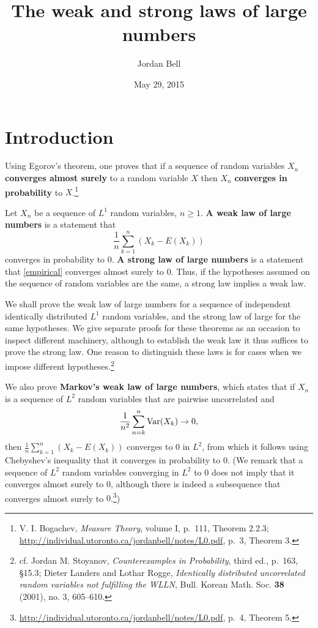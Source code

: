 \documentclass{article}
\newcommand{\Var}{\ensuremath\mathrm{Var}}
\theoremstyle{definition}
\begin{document}
\title{The weak and strong laws of large numbers}
\author{Jordan Bell}
\date{May 29, 2015}

\maketitle

\section{Introduction}
Using Egorov's theorem, one proves that if
a sequence of random variables $X_n$ \textbf{converges almost surely} to a random variable $X$ then
$X_n$ \textbf{converges in probability} to $X$.\footnote{
V. I. Bogachev, {\em Measure Theory}, volume I, p.~111, Theorem 2.2.3;
\url{http://individual.utoronto.ca/jordanbell/notes/L0.pdf},
p.~3, Theorem 3.}

Let $X_n$ be a sequence of $L^1$ random variables, $n \geq 1$. 
\textbf{A weak law of large numbers} is a statement 
that
\begin{equation}
\frac{1}{n} \sum_{k=1}^n(X_k-E(X_k))
\label{empirical}
\end{equation}
 converges in probability to $0$.
\textbf{A strong law of large numbers} is a statement
that
\eqref{empirical}
 converges almost surely to $0$. 
Thus, if the hypotheses assumed on the sequence of random variables
are the same, a strong law implies a weak law.

We shall
prove the weak law of large numbers for a sequence of
 independent identically distributed $L^1$ random variables, and the strong law of large
for the same hypotheses. We give separate proofs for these theorems as an occasion  to inspect different machinery,
although to establish the weak law it thus suffices
to prove the strong law. One reason to distinguish these laws is for cases when we impose different hypotheses.\footnote{cf.
Jordan M. Stoyanov, {\em Counterexamples in Probability}, third ed., p.~163, \S 15.3;
Dieter Landers and Lothar Rogge, 
{\em Identically distributed uncorrelated random variables not fulfilling the WLLN},
Bull. Korean Math. Soc. \textbf{38} (2001), no. 3, 605--610.}

We also prove \textbf{Markov's weak law of large numbers}, which 
states that if $X_n$ is a sequence of $L^2$ random variables that are pairwise uncorrelated and
\[
\frac{1}{n^2} \sum_{n=k}^n \Var(X_k) \to 0,
\]
then $\frac{1}{n} \sum_{k=1}^n (X_k-E(X_k))$ converges to $0$ in $L^2$, from which it follows using Chebyshev's inequality that
it converges in probability to $0$. (We remark that a sequence of $L^2$ random variables converging in $L^2$ to $0$ does not
imply that it converges almost surely to $0$, although there is indeed a subsequence that converges
almost surely to $0$.\footnote{\url{http://individual.utoronto.ca/jordanbell/notes/L0.pdf}, p.~4, Theorem 5.})
\end{document}
